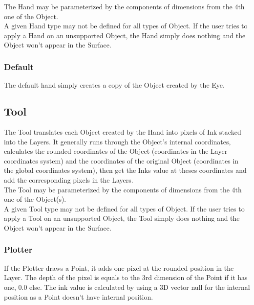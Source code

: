 The Hand may be parameterized by the components of dimensions from the 4th one of the Object.\\

A given Hand type may not be defined for all types of Object. If the user tries to apply a Hand on an unsupported Object, the Hand simply does nothing and the Object won't appear in the Surface.\\

\subsubsection{Default}

The default hand simply creates a copy of the Object created by the Eye.\\

\subsection{Tool}

The Tool translates each Object created by the Hand into pixels of Ink stacked into the Layers. It generally runs through the Object's internal coordinates, calculates the rounded coordinates of the Object (coordinates in the Layer coordinates system) and the coordinates of the original Object (coordinates in the global coordinates system), then get the Inks value at theses coordinates and add the corresponding pixels in the Layers.\\

The Tool may be parameterized by the components of dimensions from the 4th one of the Object(s).\\

A given Tool type may not be defined for all types of Object. If the user tries to apply a Tool on an unsupported Object, the Tool simply does nothing and the Object won't appear in the Surface.\\

\subsubsection{Plotter}

If the Plotter draws a Point, it adds one pixel at the rounded position in the Layer. The depth of the pixel is equals to the 3rd dimension of the Point if it has one, 0.0 else. The ink value is calculated by using a 3D vector null for the internal position as a Point doesn't have internal position.\\

